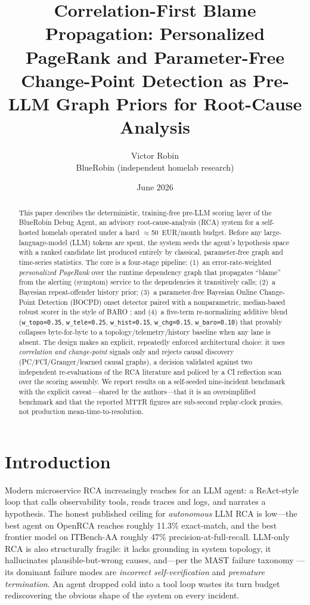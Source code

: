 \documentclass[11pt]{article}
\title{Correlation-First Blame Propagation: Personalized PageRank and
Parameter-Free Change-Point Detection as Pre-LLM Graph Priors for
Root-Cause Analysis}
\author{Victor Robin\\ BlueRobin (independent homelab research)}
\date{June 2026}
\begin{document}
\maketitle

\begin{abstract}
This paper describes the deterministic, training-free pre-LLM scoring layer of
the BlueRobin Debug Agent, an advisory root-cause-analysis (RCA) system for a
self-hosted homelab operated under a hard $\approx$50~EUR/month budget. Before
any large-language-model (LLM) tokens are spent, the system seeds the agent's
hypothesis space with a ranked candidate list produced entirely by classical,
parameter-free graph and time-series statistics. The core is a four-stage
pipeline: (1)~an error-rate-weighted \emph{personalized PageRank} over the
runtime dependency graph that propagates ``blame'' from the alerting (symptom)
service to the dependencies it transitively calls; (2)~a Bayesian
repeat-offender history prior; (3)~a parameter-free Bayesian Online Change-Point
Detection (BOCPD) onset detector paired with a nonparametric, median-based
robust scorer in the style of BARO \citep{baro}; and (4)~a five-term
re-normalizing additive blend (\texttt{w\_topo=0.35}, \texttt{w\_tele=0.25},
\texttt{w\_hist=0.15}, \texttt{w\_chg=0.15}, \texttt{w\_baro=0.10}) that provably
collapses byte-for-byte to a topology/telemetry/history baseline when any lane is
absent. The design makes an explicit, repeatedly enforced architectural choice:
it uses \emph{correlation and change-point} signals only and rejects causal
discovery (PC/FCI/Granger/learned causal graphs), a decision validated against
two independent re-evaluations of the RCA literature
\citep{rcaeval,zhang2024causal} and policed by a CI reflection scan over the
scoring assembly. We report results on a self-seeded nine-incident benchmark with
the explicit caveat---shared by the authors---that it is an oversimplified
benchmark and that the reported MTTR figures are sub-second replay-clock proxies,
not production mean-time-to-resolution.
\end{abstract}

\section{Introduction}

Modern microservice RCA increasingly reaches for an LLM agent: a ReAct-style
\citep{react} loop that calls observability tools, reads traces and logs, and
narrates a hypothesis. The honest published ceiling for \emph{autonomous} LLM RCA
is low---the best agent on OpenRCA \citep{openrca} reaches roughly 11.3\%
exact-match, and the best frontier model on ITBench-AA \citep{itbenchaa} roughly
47\% precision-at-full-recall. LLM-only RCA is also structurally fragile: it lacks
grounding in system topology, it hallucinates plausible-but-wrong causes,
and---per the MAST failure taxonomy \citep{mast}---its dominant failure modes are
\emph{incorrect self-verification} and \emph{premature termination}. An agent
dropped cold into a tool loop wastes its turn budget rediscovering the obvious
shape of the system on every incident.
\end{document}
